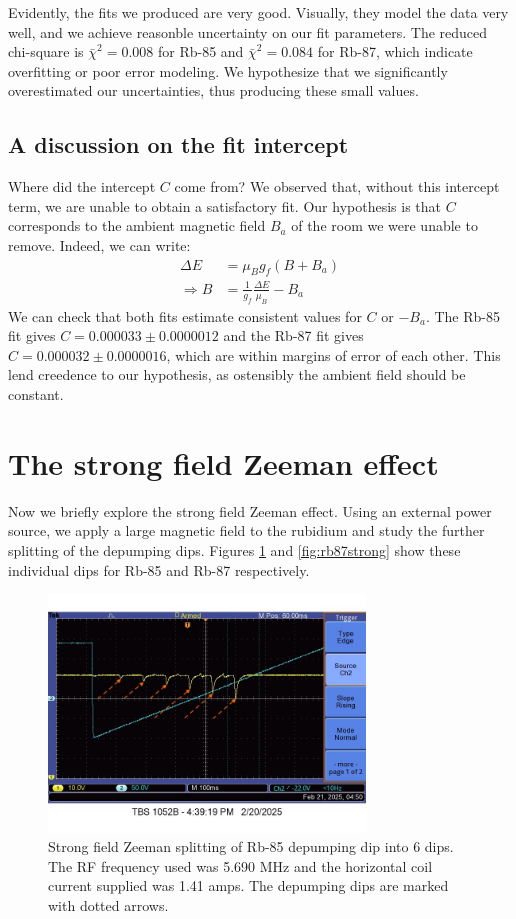 \documentclass[12pt, letterpaper]{article}
\begin{document}
Evidently, the fits we produced are very good. Visually, they model the data very well, and we achieve reasonble uncertainty on our fit parameters. The reduced chi-square is $\bar{\chi}^2=0.008$ for Rb-85 and $\bar{\chi}^2=0.084$ for Rb-87, which indicate overfitting or poor error modeling. We hypothesize that we significantly overestimated our uncertainties, thus producing these small values. 

\subsection{A discussion on the fit intercept}

Where did the intercept $C$ come from? We observed that, without this intercept term, we are unable to obtain a satisfactory fit. Our hypothesis is that $C$ corresponds to the ambient magnetic field $B_a$ of the room we were unable to remove. Indeed, we can write:
\begin{align*}
    \Delta E &= \mu_B g_f (B + B_{a}) \\
    \Rightarrow B &= \frac{1}{g_f} \frac{\Delta E}{\mu_B} - B_a
\end{align*}
We can check that both fits estimate consistent values for $C$ or $-B_a$. The Rb-85 fit gives $C = 0.000033 \pm 0.0000012$ and the Rb-87 fit gives $C = 0.000032 \pm 0.0000016$, which are within margins of error of each other. This lend creedence to our hypothesis, as ostensibly the ambient field should be constant. 

\section{The strong field Zeeman effect} \label{sec:strong}

Now we briefly explore the strong field Zeeman effect. Using an external power source, we apply a large magnetic field to the rubidium and study the further splitting of the depumping dips. Figures \ref{fig:rb85strong} and \ref{fig:rb87strong} show these individual dips for Rb-85 and Rb-87 respectively. 

\begin{figure}[!h]
    \centering
    \includegraphics[width=0.75\textwidth]{experiment4/figures/rb85-strong.jpg}
    \caption{Strong field Zeeman splitting of Rb-85 depumping dip into 6 dips. The RF frequency used was 5.690 MHz and the horizontal coil current supplied was 1.41 amps. The depumping dips are marked with dotted arrows. }
    \label{fig:rb85strong}
\end{figure}
\end{document}
